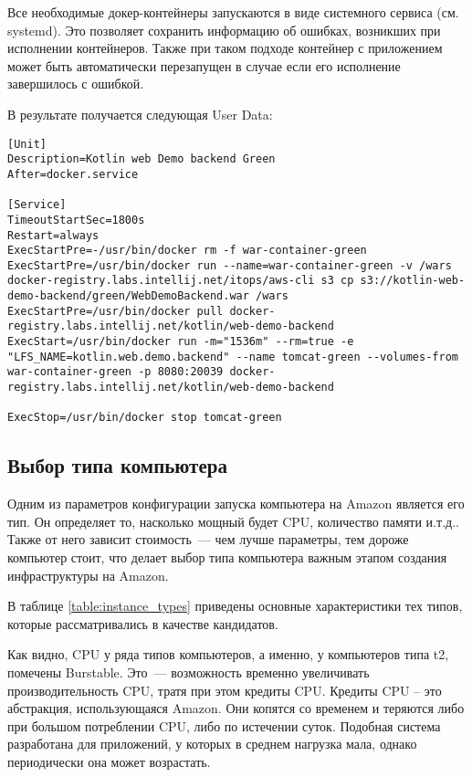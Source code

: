 	Все необходимые докер-контейнеры запускаются в виде системного сервиса (см. systemd). Это позволяет сохранить информацию об ошибках, возникших при исполнении контейнеров. Также при таком подходе контейнер с приложением может быть автоматически перезапущен в случае если его исполнение завершилось с ошибкой.
	
	В результате получается следующая User Data:
\begin{lstlisting}
[Unit]
Description=Kotlin web Demo backend Green
After=docker.service

[Service]
TimeoutStartSec=1800s
Restart=always
ExecStartPre=-/usr/bin/docker rm -f war-container-green
ExecStartPre=/usr/bin/docker run --name=war-container-green -v /wars docker-registry.labs.intellij.net/itops/aws-cli s3 cp s3://kotlin-web-demo-backend/green/WebDemoBackend.war /wars
ExecStartPre=/usr/bin/docker pull docker-registry.labs.intellij.net/kotlin/web-demo-backend
ExecStart=/usr/bin/docker run -m="1536m" --rm=true -e "LFS_NAME=kotlin.web.demo.backend" --name tomcat-green --volumes-from war-container-green -p 8080:20039 docker-registry.labs.intellij.net/kotlin/web-demo-backend

ExecStop=/usr/bin/docker stop tomcat-green
\end{lstlisting}

\subsection{Выбор типа компьютера}
	Одним из параметров конфигурации запуска компьютера на Amazon является его тип. Он определяет то, насколько мощный будет CPU, количество памяти и.т.д.. Также от него зависит стоимость~--- чем лучше параметры, тем дороже компьютер стоит, что делает выбор типа компьютера важным этапом создания инфраструктуры на Amazon.
	
	В таблице \ref{table:instance_types} приведены основные характеристики тех типов, которые рассматривались в качестве кандидатов.
	
	Как видно, CPU у ряда типов компьютеров, а именно, у компьютеров типа t2, помечены Burstable. Это~--- возможность временно увеличивать производительность CPU, тратя при этом кредиты CPU. Кредиты CPU -- это абстракция, использующаяся Amazon. Они копятся со временем и теряются либо при большом потреблении CPU, либо по истечении суток. Подобная система разработана для приложений, у которых в среднем нагрузка мала, однако периодически она может возрастать.
	
